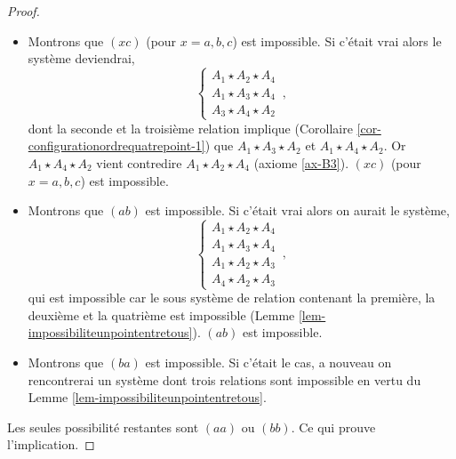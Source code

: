 \begin{cor}
\begin{proof}
\begin{itemize}[$\bullet$]
\begin{equation*}
\begin{array}{cc}
                     A_1 \star A_2 \star A_4  \\
                     A_1 \star A_3 \star A_4
                \end{array}\right.\,,
            \end{equation*}
            dont la première et la dernière relation implique (corrolaire \ref{cor-configurationordrequatrepoint-1}) que $A_3 \star A_1 \star A_4$ et $A_3 \star A_2 \star A_4$. Or $A_3 \star A_1 \star A_4$ vient contredire $A_1 \star A_3 \star A_4$ (axiome \ref{ax-B3}). $(cx)$ (pour $x=a,b,c$) est impossible.
            \item Montrons que $(xc)$ (pour $x=a,b,c$)  est impossible. Si c'était vrai alors le système deviendrai,
            \begin{equation*}
                \left\{\begin{array}{cc}
                     A_1 \star A_2 \star A_4  \\
                     A_1 \star A_3 \star A_4 \\
                     A_3 \star A_4 \star A_2
                \end{array}\right.\,,
            \end{equation*}    
            dont la seconde et la troisième relation implique (Corollaire \ref{cor-configurationordrequatrepoint-1}) que $A_1 \star A_3 \star A_2$ et $A_1 \star A_4 \star A_2$. Or $A_1 \star A_4 \star A_2$ vient contredire $A_1 \star A_2 \star A_4$ (axiome \ref{ax-B3}). $(xc)$ (pour $x=a,b,c$)  est impossible.
            \item Montrons que $(ab)$ est impossible. Si c'était vrai alors on aurait le système,
            \begin{equation*}
                \left\{\begin{array}{cc}
                     A_1 \star A_2 \star A_4 \\
                     A_1 \star A_3 \star A_4 \\
                     A_1 \star A_2 \star A_3 \\
                     A_4 \star A_2 \star A_3
                \end{array}\right.\,,
            \end{equation*}  
            qui est impossible car le sous système de relation contenant la première, la deuxième et la quatrième est impossible (Lemme \ref{lem-impossibiliteunpointentretous}). $(ab)$ est impossible.
            \item Montrons que $(ba)$ est impossible. Si c'était le cas, a nouveau on rencontrerai un système dont trois relations sont impossible en vertu du Lemme \ref{lem-impossibiliteunpointentretous}.
        \end{itemize}
        Les seules possibilité restantes sont $(aa)$ ou $(bb)$. Ce qui prouve l'implication.


\end{proof}
\end{cor}
